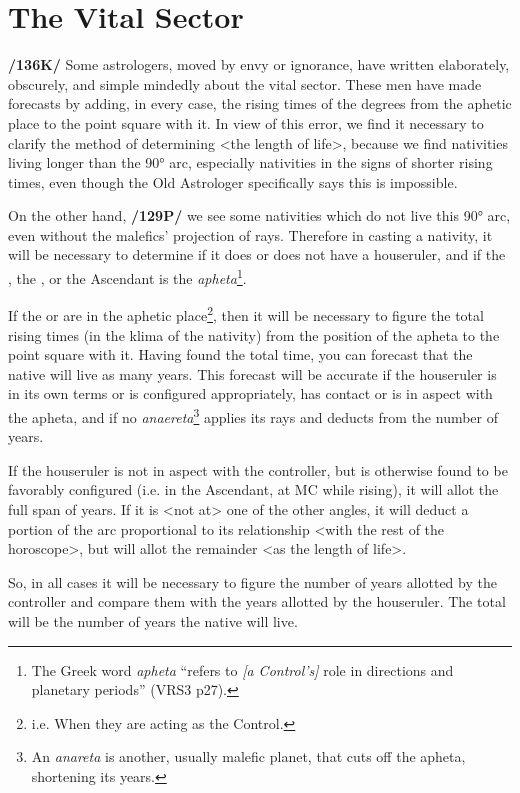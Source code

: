 \section{The Vital Sector}

\textbf{/136K/ }Some astrologers, moved by envy or ignorance, have written elaborately, obscurely, and simple mindedly
about the vital sector. These men have made forecasts by adding, in every case, the rising times of the degrees from the aphetic place to the point square with it. In view of this error, we find it necessary to clarify the method of determining <the length of life>, because we find nativities living longer than the 90° arc, especially nativities in the signs of shorter rising times, even though the Old Astrologer specifically says this is impossible. 

On the other hand, \textbf{/129P/} we see some nativities which do not live this 90° arc, even without the malefics’ projection of rays. Therefore in casting a nativity, it will be necessary to determine if it does or does not have a
houseruler, and if the \Sun, the \Moon, or the Ascendant is the \textsl{apheta}\footnote{The Greek word \textsl{apheta} ``refers to \textsl{[a Control's]} role in directions and planetary periods'' (VRS3 p27).}. 

If the \Sun\xspace or \Moon\xspace are in the aphetic
place\footnote{i.e. When they are acting as the Control.}, then it will be necessary to figure the total rising times (in the klima of the nativity) from the position of the apheta to the point square with it. Having found the total time, you can forecast that the native will live as many years. This forecast will be accurate if the houseruler is in its own terms or is configured appropriately, has contact or is in aspect with the apheta, and if no \textsl{anaereta}\footnote{An \textsl{anareta} is another, usually malefic planet, that cuts off the apheta, shortening its years. } applies its rays and deducts from the number of years. 

If the houseruler is not in aspect with the controller, but is otherwise found to be favorably configured (i.e. in the Ascendant, at MC while rising), it will allot the full span of
years. If it is <not at> one of the other angles, it will deduct a portion of the arc proportional to its relationship <with the rest of the horoscope>, but will allot the remainder <as the length of life>.

So, in all cases it will be necessary to figure the number of years allotted by the controller and compare them with the years allotted by the houseruler. The total will be the number of years the native will live.

